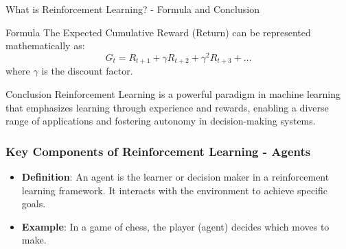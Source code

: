 \documentclass[aspectratio=169]{beamer}
\begin{document}
\begin{frame}[fragile]{What is Reinforcement Learning? - Formula and Conclusion}
    \begin{block}{Formula}
        The Expected Cumulative Reward (Return) can be represented mathematically as:
        \[
        G_t = R_{t+1} + \gamma R_{t+2} + \gamma^2 R_{t+3} + \ldots
        \]
        where \(\gamma\) is the discount factor.
    \end{block}
    
    \begin{block}{Conclusion}
        Reinforcement Learning is a powerful paradigm in machine learning that emphasizes learning through experience and rewards, enabling a diverse range of applications and fostering autonomy in decision-making systems.
    \end{block}
\end{frame}

\begin{frame}[fragile]
  \frametitle{Key Components of Reinforcement Learning - Agents}
  \begin{itemize}
    \item \textbf{Definition}: 
    An agent is the learner or decision maker in a reinforcement learning framework. It interacts with the environment to achieve specific goals.
    
    \item \textbf{Example}:
    In a game of chess, the player (agent) decides which moves to make.
  \end{itemize}
\end{frame}
\end{document}
